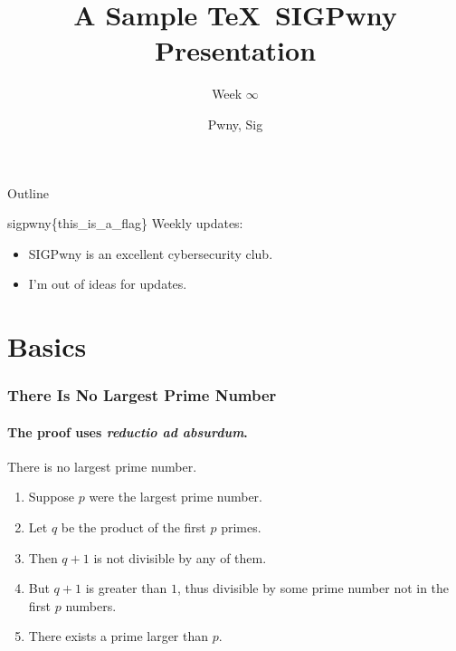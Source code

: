 \documentclass{beamer}
\title{A Sample \TeX\ SIGPwny Presentation}
\subtitle{Week $\infty$}
\author{Pwny, Sig}
\date{}
\begin{document}

\begin{frame}
\titlepage
\end{frame}

\begin{frame}{Outline}
  \tableofcontents
\end{frame}

\begin{frame}{sigpwny\{this\_is\_a\_flag\}}
  Weekly updates:
  \begin{itemize}
    \item SIGPwny is an excellent cybersecurity club.
    \item I'm out of ideas for updates.
  \end{itemize}
\end{frame}

\section{Basics}
\frame{\sectionpage}

\begin{frame}
  \frametitle{There Is No Largest Prime Number}
  \framesubtitle{The proof uses \textit{reductio ad absurdum}.}
  \begin{theorem}
    There is no largest prime number.
  \end{theorem}
  \begin{enumerate}
    \item<1-| alert@1> Suppose $p$ were the largest prime number.
    \item<2-> Let $q$ be the product of the first $p$ primes.
    \item<3-> Then $q+1$ is not divisible by any of them.
    \item<4-> But $q + 1$ is greater than $1$, thus divisible by some prime
    number not in the first $p$ numbers.
    \item<5-> There exists a prime larger than $p$.
  \end{enumerate}
\end{frame}
\end{document}
